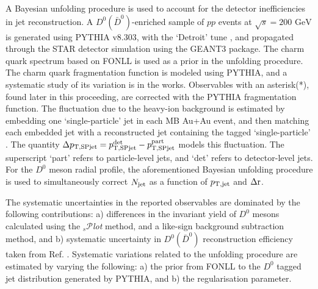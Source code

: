\documentclass{appolb}
\begin{document}
A Bayesian unfolding procedure \cite{Unfolding} is used to account for the detector inefficiencies in jet reconstruction. A $D^{0} (\bar{D}^{0})$-enriched sample of $pp$ events at $\sqrt{s} = 200 \text{ GeV}$ is generated using PYTHIA v8.303, with the `Detroit' tune \cite{STARTune}, and propagated through the STAR detector simulation using the GEANT3 \cite{GEANT3} package. The charm quark spectrum based on FONLL \cite{FONLL} is used as a prior in the unfolding procedure. The charm quark fragmentation function is modeled using PYTHIA, and a systematic study of its variation is in the works. Observables with an asterisk(*), found later in this proceeding, are corrected with the PYTHIA fragmentation function.
The fluctuation due to the heavy-ion background is estimated by embedding one  `single-particle' jet in each MB Au+Au event, and then matching each embedded jet with a reconstructed jet containing the tagged `single-particle' \cite{SPJet_JetQuenching}. The quantity $\Delta p_{\rm T, SP jet} = p_{\rm T, SP jet}^{\rm det} - p_{\rm T, SP jet}^{\rm part}$ models this fluctuation. The superscript `part' refers to particle-level jets, and `det' refers to detector-level jets.
For the $D^{0}$ meson radial profile, the aforementioned Bayesian unfolding procedure is used to simultaneously correct $N_{\rm jet}$ as a function of $p_{\rm T,jet}$ and $\Delta \rm r$. 




The systematic uncertainties in the reported observables are dominated by the following contributions: a) differences in the invariant yield of $D^{0}$ mesons calculated using the $_s$\( \mathcal{P} \)\textit{lot} method, and a like-sign background subtraction method, and b) systematic uncertainty in $D^{0} (\bar{D}^{0})$ reconstruction efficiency taken from Ref. \cite{STARD0PaperAuAu}. Systematic variations related to the unfolding procedure are estimated by varying the following: a) the prior from FONLL to the $D^{0}$ tagged jet distribution generated by PYTHIA, and b) the regularisation parameter.
\end{document}
